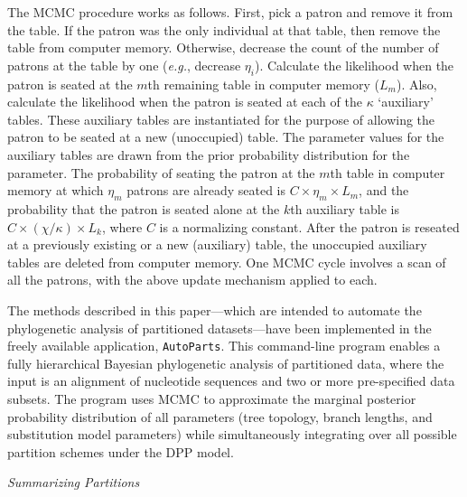 \documentclass[11pt]{article}
\begin{document}
The MCMC procedure works as follows. 
First, pick a patron and remove it from the table. If the patron was the only individual at that table, then remove the table from computer memory.
Otherwise, decrease the count of the number of patrons at the table by one ({\it e.g.}, decrease $\eta_i$).
Calculate the likelihood when the patron is seated at 
the $m$th remaining table in computer memory ($L_m$).
Also, calculate the likelihood when the patron is seated at each of the $\kappa$ `auxiliary' tables.
These auxiliary tables are instantiated for the purpose of allowing the patron to be seated at a new (unoccupied) table.
The parameter values for the auxiliary tables are drawn from the prior probability distribution for the parameter.
The probability of seating the patron at the $m$th table in computer memory at which $\eta_m$ patrons are already seated is
$C \times \eta_m \times L_m$, and the probability that the patron is seated alone at the $k$th auxiliary table is $C \times (\chi/ \kappa) \times L_k$, where
$C$ is a normalizing constant.
After the patron is reseated at a previously existing or a new (auxiliary) table, the unoccupied auxiliary tables are deleted from computer memory.
One MCMC cycle involves a scan of all the patrons, with the above update mechanism applied to each.

The methods described in this paper---which are intended to automate the phylogenetic analysis of partitioned datasets---have been implemented in the freely available
application, \verb!AutoParts!.
This command-line program enables a fully hierarchical Bayesian phylogenetic analysis of partitioned data, where the input is an alignment of nucleotide sequences and two or more pre-specified data subsets.
The program uses MCMC to approximate the marginal posterior probability distribution of all parameters (tree topology, branch lengths, and substitution model parameters) while simultaneously integrating over all possible partition schemes under the DPP model.  


\newpage

\begin{center}
{\it Summarizing Partitions}
\end{center}
\end{document}

